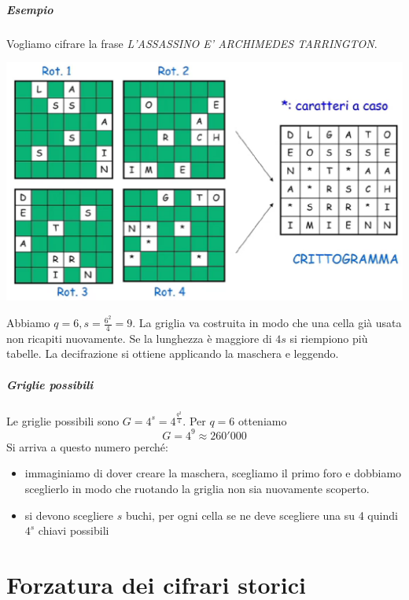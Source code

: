 \paragraph{Esempio} Vogliamo cifrare la frase \emph{L'ASSASSINO E' ARCHIMEDES TARRINGTON}.
\begin{center}
	\includegraphics[scale=.38]{images/12.PNG}
\end{center}
Abbiamo $q=6, s=\frac{6^2}{4}=9$. La griglia va costruita in modo che una cella già usata non ricapiti nuovamente. Se la lunghezza è maggiore di $4s$ si riempiono più tabelle. La decifrazione si ottiene applicando la maschera e leggendo. 

\paragraph{Griglie possibili} Le griglie possibili sono $G = 4^s = 4^{\frac{q^2}{4}}$. Per $q=6$ otteniamo
$$G = 4^9 \approx 260'000$$Si arriva a questo numero perché:
\begin{itemize}
    \item immaginiamo di dover creare la maschera, scegliamo il primo foro e dobbiamo sceglierlo in modo che ruotando la griglia non sia nuovamente scoperto.
    \item si devono scegliere $s$ buchi, per ogni cella se ne deve scegliere una su 4 quindi $4^s$ chiavi possibili
\end{itemize}
\clearpage 

\chapter{Forzatura dei cifrari storici}
